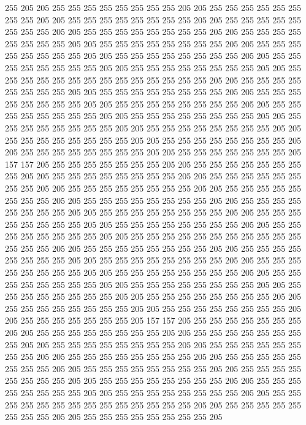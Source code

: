 255 205 205 255 255 255 255 255 255 255 255 205 205 255 255 255 255 255 255 255
255 205 205 255 255 255 255 255 255 255 255 205 205 255 255 255 255 255 255 255
255 205 205 255 255 255 255 255 255 255 255 205 205 255 255 255 255 255 255 255
255 205 205 255 255 255 255 255 255 255 255 205 205 255 255 255 255 255 255 255
255 205 205 255 255 255 255 255 255 255 255 205 205 255 255 255 255 255 255 255
255 205 205 255 255 255 255 255 255 255 255 205 205 255 255 255 255 255 255 255
255 255 255 255 255 255 255 205 205 255 255 255 255 255 255 255 255 205 205 255
255 255 255 255 255 255 255 205 205 255 255 255 255 255 255 255 255 205 205 255
255 255 255 255 255 255 255 205 205 255 255 255 255 255 255 255 255 205 205 255
255 255 255 255 255 255 255 205 205 255 255 255 255 255 255 255 255 205 205 255
255 255 255 255 255 255 255 205 205 255 255 255 255 255 255 255 255 205 205 255
255 255 255 255 255 255 255 205 205 255 255 255 255 255 255 255 255 205 205 255
255 255 255 255 255 255 205 157 157 205 255 255 255 255 255 255 255 205 205 255
255 255 255 255 255 255 255 205 205 255 255 255 255 255 255 255 255 205 205 255
255 255 255 255 255 255 255 205 205 255 255 255 255 255 255 255 255 205 205 255
255 255 255 255 255 255 255 205 205 255 255 255 255 255 255 255 255 205 205 255
255 255 255 255 255 255 255 205 205 255 255 255 255 255 255 255 255 205 205 255
255 255 255 255 255 255 255 205 205 255 255 255 255 255 255 255 255 205 205 255
255 255 255 255 255 255 255 205 205 255 255 255 255 255 255 255 255 255 255 255
255 255 255 205 205 255 255 255 255 255 255 255 255 205 205 255 255 255 255 255
255 255 255 205 205 255 255 255 255 255 255 255 255 205 205 255 255 255 255 255
255 255 255 205 205 255 255 255 255 255 255 255 255 205 205 255 255 255 255 255
255 255 255 205 205 255 255 255 255 255 255 255 255 205 205 255 255 255 255 255
255 255 255 205 205 255 255 255 255 255 255 255 255 205 205 255 255 255 255 255
255 255 255 205 205 255 255 255 255 255 255 255 255 205 205 255 255 255 255 255
255 255 205 157 157 205 255 255 255 255 255 255 255 205 205 255 255 255 255 255
255 255 255 205 205 255 255 255 255 255 255 255 255 205 205 255 255 255 255 255
255 255 255 205 205 255 255 255 255 255 255 255 255 205 205 255 255 255 255 255
255 255 255 205 205 255 255 255 255 255 255 255 255 205 205 255 255 255 255 255
255 255 255 205 205 255 255 255 255 255 255 255 255 205 205 255 255 255 255 255
255 255 255 205 205 255 255 255 255 255 255 255 255 205 205 255 255 255 255 255
255 255 255 205 205 255 255 255 255 255 255 255 255 255 255 255 255 255 255 205
205 255 255 255 255 255 255 255 255 205 205 255 255 255 255 255 255 255 255 205

